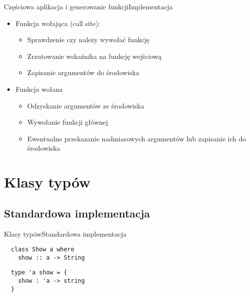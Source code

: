 \documentclass{beamer}
\begin{document}
\begin{frame}{Częściowa aplikacja i generowanie funkcji}{Implementacja}
\begin{itemize}
    \item Funkcja wołająca (call site):
    \begin{itemize}
        \pause
        \item Sprawdzenie czy należy wywołać funkcję 
        \pause 
        \item Zrzutowanie wskaźnika na funkcję wejściową
        \pause
        \item Zapisanie argumentów do środowiska
    \end{itemize}
    \pause
    \item Funkcja wołana
    \begin{itemize}
        \pause
        \item Odzyskanie argumentów ze środowiska 
        \pause
        \item Wywołanie funkcji głównej 
        \pause
        \item Ewentualne przekazanie nadmiarowych argumentów lub zapisanie ich
        do środowiska
    \end{itemize}
\end{itemize}
\end{frame}

\section{Klasy typów}

\subsection{Standardowa implementacja}

\begin{frame}[fragile]{Klasy typów}{Standardowa implementacja}
\begin{center}
\begin{minipage}{1.0\textwidth}
\pause
\begin{verbatim}
  class Show a where
    show :: a -> String
\end{verbatim}
\pause
\pagebreak
\pagebreak
\begin{verbatim}
  type 'a show = {
    show : 'a -> string
  }
\end{verbatim}
\end{minipage}
\end{center}
\end{frame}
\end{document}
